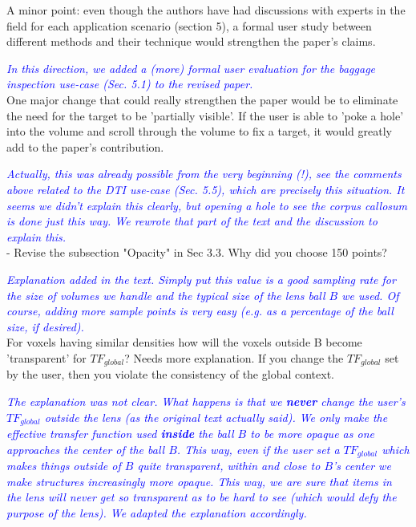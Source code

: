 \documentclass[a4paper,10pt]{article}
\newcommand{\rr}[1]{\emph{\textcolor{blue}{#1}}}
\begin{document}
    A minor point: even though the authors have had discussions with experts in the
    field for each application scenario (section 5), a formal user study between
    different methods and their technique would strengthen the paper's claims.
    
    \rr{In this direction, we added a (more) formal user evaluation for the baggage inspection use-case (Sec. 5.1) to the revised paper.}\\

    One major change that could really strengthen the paper would be to eliminate the
    need for the target to be 'partially visible'. If the user is able to 'poke a
    hole' into the volume and scroll through the volume to fix a target, it would
    greatly add to the paper's contribution.
    
    \rr{Actually, this was already possible from the very beginning (!), see the comments above related to the DTI use-case (Sec. 5.5), which are precisely this situation. It seems we didn't explain this clearly, but opening a hole to see the corpus callosum is done just this way. We rewrote that part of the text and the discussion to explain this.}\\
    
    - Revise the subsection "Opacity" in Sec 3.3. Why did you choose 150 points? 
    
    \rr{Explanation added in the text. Simply put this value is a good sampling rate for the size of volumes we handle and the typical size of the lens ball $B$ we used. Of course, adding more sample points is very easy (e.g. as a percentage of the ball size, if desired).}\\
    
    For voxels having similar densities how will the voxels outside B become 'transparent'
    for $TF_{global}$? Needs more explanation. If you change the $TF_{global}$ set by the
    user, then you violate the consistency of the global context.
    
    \rr{The explanation was not clear. What happens is that we \textbf{never} change the user's $TF_{global}$ outside the lens (as the original text actually said). We only make the effective transfer function used \textbf{inside} the ball $B$ to be more opaque as one approaches the center of the ball $B$. This way, even if the user set a $TF_{global}$ which makes things outside of $B$ quite transparent, within and close to $B$'s center we make structures increasingly more opaque. This way, we are sure that items in the lens will never get so transparent as to be hard to see (which would defy the purpose of the lens). We adapted the explanation accordingly.}\\
\end{document}
